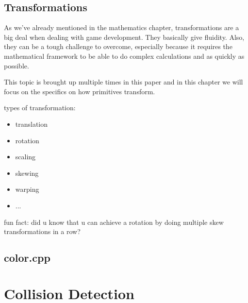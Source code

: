         \subsection{Transformations}
            As we've already mentioned in the mathematics chapter, transformations are a big deal when dealing with game development. They basically give fluidity. Also, they can be a tough challenge to overcome, especially because it requires the mathematical framework to be able to do complex calculations and as quickly as possible. 

            This topic is brought up multiple times in this paper and in this chapter we will focus on the specifics on how primitives transform.
            
            types of transformation:
            \begin{itemize}
                \item translation
                \item rotation
                \item scaling
                \item skewing
                \item warping
                \item ...
            \end{itemize}

            fun fact: did u know that u can achieve a rotation by doing multiple skew transformations in a row?
        \subsection{color.cpp}
    \section{Collision Detection}







